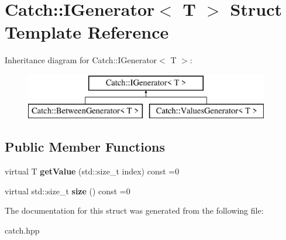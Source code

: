 \hypertarget{structCatch_1_1IGenerator}{}\section{Catch\+:\+:I\+Generator$<$ T $>$ Struct Template Reference}
\label{structCatch_1_1IGenerator}
Inheritance diagram for Catch\+:\+:I\+Generator$<$ T $>$\+:\begin{figure}[H]
\begin{center}
\leavevmode
\includegraphics[height=2.000000cm]{structCatch_1_1IGenerator}
\end{center}
\end{figure}
\subsection*{Public Member Functions}
\begin{DoxyCompactItemize}
\item 
virtual T {\bfseries get\+Value} (std\+::size\+\_\+t index) const  =0\hypertarget{structCatch_1_1IGenerator_a242bb447d6a37784215be6df7d44bb6a}{}\label{structCatch_1_1IGenerator_a242bb447d6a37784215be6df7d44bb6a}

\item 
virtual std\+::size\+\_\+t {\bfseries size} () const  =0\hypertarget{structCatch_1_1IGenerator_a9a03cf8579a60da0714fda6e5bd0af04}{}\label{structCatch_1_1IGenerator_a9a03cf8579a60da0714fda6e5bd0af04}

\end{DoxyCompactItemize}


The documentation for this struct was generated from the following file\+:\begin{DoxyCompactItemize}
\item 
catch.\+hpp\end{DoxyCompactItemize}
